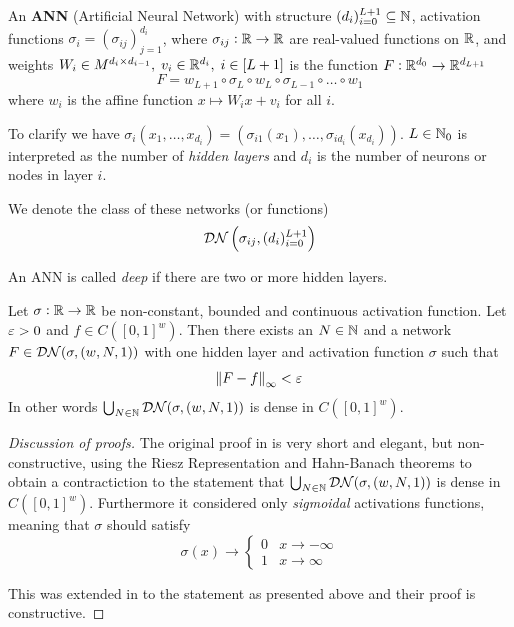 \begin{defn}\label{def_ANN}
  An \textbf{ANN} (Artificial Neural Network) with structure
  $(d_i)_{i=0}^{L+1} \subseteq \mathbb{N}$,
  activation functions $\sigma_i = (\sigma_{ij})_{j=1}^{d_i}$, where
  $\sigma_{ij} : \mathbb{R} \to \mathbb{R}$ are real-valued functions on $\mathbb{R}$,
  and weights $W_i \in M^{d_i \times d_{i-1}}, \; v_i \in \mathbb{R}^{d_i}, \;
  i \in [L+1]$
  is the function $F:\mathbb{R}^{d_0} \to \mathbb{R}^{d_{L+1}}$ 
  \[ F = w_{L+1} \circ \sigma_L \circ w_L
  \circ \sigma_{L-1} \circ \dots \circ w_1 \]
  where $w_i$ is the affine function $x \mapsto W_i x + v_i$ for all $i$.
\end{defn}

To clarify we have $\sigma_i(x_1, \dots, x_{d_i})
= (\sigma_{i1}(x_1), \dots, \sigma_{id_{i}}(x_{d_{i}}))$.
$L \in \mathbb{N}_0$ is interpreted as the number of \emph{hidden layers} and
$d_i$ is the number of neurons or nodes in layer $i$.

We denote the class of these networks (or functions)
\[ \mathcal{DN} \left(\sigma_{ij}, ( d_i )_{i=0}^{L+1} \right) \]

An ANN is called \emph{deep} if there are two or more hidden layers.


\begin{thm}
  Let $\sigma: \mathbb{R} \to \mathbb{R}$ be non-constant, bounded and continuous
  activation function.
  Let $\varepsilon > 0$ and $f \in C([0,1]^w)$.
  Then there exists an $N \in \mathbb{N}$ and a network
  $F \in \mathcal{DN}(\sigma, (w, N, 1))$
  with one hidden layer
  and activation function $\sigma$ such that
  \[ \norm{F - f}_\infty < \varepsilon \]
  In other words $\bigcup_{N \in \mathbb{N}} \mathcal{DN}(\sigma, (w, N, 1))$ is
  dense in $C([0,1]^w)$.
  \label{thm:uniApprox}
\end{thm}
\begin{proof}[Discussion of proofs]
  The original proof in  is very short and elegant,
  but non-constructive,
  using the Riesz Representation and Hahn-Banach theorems to
  obtain a contractiction to the statement that
  $\bigcup_{N \in \mathbb{N}} \mathcal{DN}(\sigma, (w,N,1))$
  is dense in $C([0,1]^w)$.
  Furthermore it considered only \emph{sigmoidal} activations
  functions, meaning that $\sigma$ should satisfy
  \[ \sigma(x) \to \begin{cases} 0 & x \to -\infty
  \\ 1 & x \to \infty \end{cases} \]
  
  This was extended in  to the statement as presented above
  and their proof is constructive. 
\end{proof}

